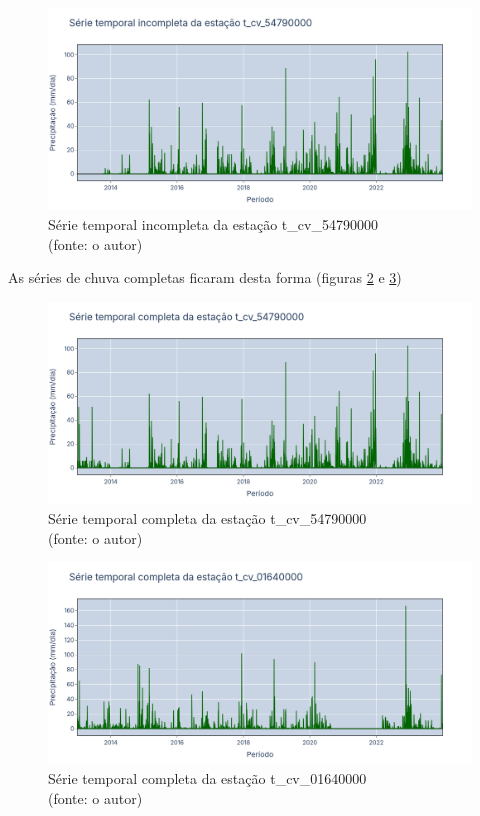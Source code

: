 \begin{figure}[!h]
	\centering
	\includegraphics[scale=0.25]{Figuras/jequiti/jequitinhonhaSerieIncompleta_t_cv_54790000.png}
	\caption{Série temporal incompleta da estação t\_cv\_54790000\\(fonte: o autor)}
	\label{fig:jequitinhonhaSerieIncompleta_t_cv_54790000}
\end{figure}

As séries de chuva completas ficaram desta forma (figuras \ref{fig:jequitinhonhaSerieCompleta_t_cv_54790000} e \ref{fig:jequitinhonhaSerieCompleta_t_cv_01640000})

\begin{figure}[!h]
	\centering
	\includegraphics[scale=0.25]{Figuras/jequiti/jequitinhonhaSerieCompleta_t_cv_54790000.png}
	\caption{Série temporal completa da estação t\_cv\_54790000\\(fonte: o autor)}
	\label{fig:jequitinhonhaSerieCompleta_t_cv_54790000}
\end{figure}

\begin{figure}[!h]
	\centering
	\includegraphics[scale=0.25]{Figuras/jequiti/jequitinhonhaSerieCompleta_t_cv_01640000.png}
	\caption{Série temporal completa da estação t\_cv\_01640000\\(fonte: o autor)}
	\label{fig:jequitinhonhaSerieCompleta_t_cv_01640000}
\end{figure}
\clearpage

